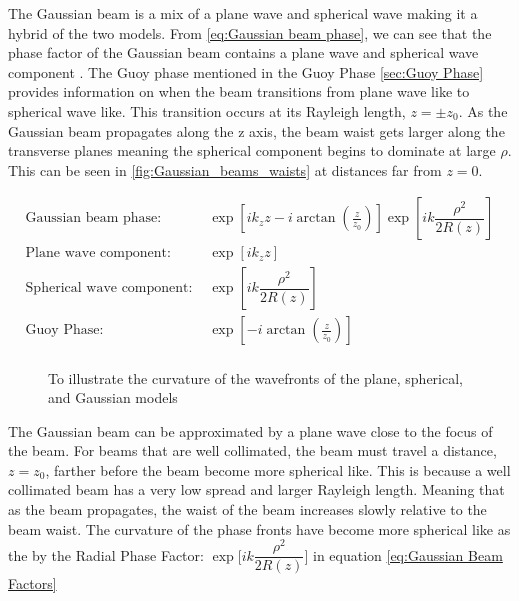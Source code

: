 \documentclass[11pt,a4paper]{book}
\newcommand{\imginput}[1]{} %
\begin{document}
		The Gaussian beam is a mix of a plane wave and spherical wave making it a hybrid of the two models. From \autoref{eq:Gaussian beam phase}, we can see that the phase factor of the Gaussian beam contains a plane wave and spherical wave component . The Guoy phase mentioned in the Guoy Phase \autoref{sec:Guoy Phase} provides information on when the beam transitions from plane wave like to spherical wave like. This transition occurs at its Rayleigh length, $z = \pm z_0$. As the Gaussian beam propagates along the z axis, the beam waist gets larger along the transverse planes meaning the spherical component begins to dominate at large $\rho$. This can be seen in \autoref{fig:Gaussian_beams_waists} at distances far from $z = 0$.
		
		\begin{equation}
			\label{eq:Gaussian beam phase}
			\begin{split}
			\text{Gaussian beam phase: }& \exp{\left[ik_z z - i \arctan{\left(\frac{z}{z_0}\right)}\right]}
			\exp{\left[ik \dfrac{\rho^2}{2R(z)} \right]}\\
			\text{Plane wave component: }& \exp{ \left[ i k_z z \right]} \\
			\text{Spherical wave component: }& \exp{\left[ik \dfrac{\rho^2}{2R(z)} \right]} \\
			\text{Guoy Phase: } & \exp{\left[ - i \arctan{\left(\frac{z}{z_0}\right)}\right]} \\
			\end{split}
		\end{equation}
		
		\begin{figure} [!ht]
			\centering
			\def\svgwidth{\columnwidth}
			\resizebox{16cm}{!}{\imginput{images/wavefront.pdf_tex}}
			\caption{To illustrate the curvature of the wavefronts of the plane, spherical, and Gaussian models} 
			\label{fig:wavefront}
		\end{figure}	
		
		The Gaussian beam can be approximated by a plane wave close to the focus of the beam. For beams that are well collimated, the beam must travel a distance, $z=z_0$, farther before the beam become more spherical like. This is because a well collimated beam has a very low spread and larger Rayleigh length. Meaning that as the beam propagates, the waist of the beam increases slowly relative to the beam waist. The curvature of the phase fronts have become more spherical like as the by the Radial Phase Factor: $ \exp\bigg[ik \dfrac{\rho^2}{2R(z)}\bigg]$ in equation \autoref{eq:Gaussian Beam Factors}
		
\end{document}
